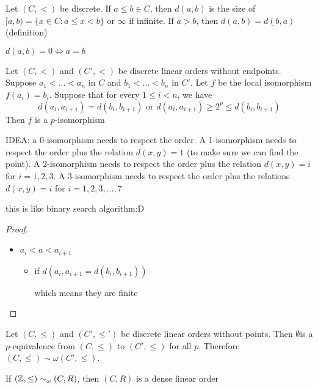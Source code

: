 \documentclass[11pt]{article}
\begin{document}
\begin{definition}[]
Let \((C,<)\) be discrete. If \(a\le b\in C\), then \(d(a,b)\) is the size
of \([a,b)=\{x\in C:a\le x<b\}\) or \(\infty\) if infinite. If \(a>b\), then \(d(a,b)=d(b,a)\) (definition)
\end{definition}

\(d(a,b)=0\Leftrightarrow a=b\)

\begin{lemma}[]
Let \((C,<)\) and \((C',<)\) be discrete linear orders without endpoints. Suppose \(a_1<\dots<a_n\)
in \(C\) and \(b_1<\dots<b_n\) in \(C'\). Let \(f\) be the local isomorphism \(f(a_i)=b_i\). Suppose
that for every \(1\le i<n\), we have
\begin{equation*}
d(a_i,a_{i+1})=d(b_i,b_{i+1})\text{ or }d(a_i,a_{i+1})\ge 2^p\le d(b_i,b_{i+1})
\end{equation*}
Then \(f\) is a \(p\)-isomorphism
\end{lemma}

IDEA: a 0-isomorphism needs to respect the order. A 1-isomorphism needs to respect the order
plus the relation \(d(x,y)=1\) (to make sure we can find the point). A 2-isomorphism needs to
respect the order plus the
relation \(d(x,y)=i\) for \(i=1,2,3\). A 3-isomorphism needs to respect the order plus the
relations \(d(x,y)=i\) for \(i=1,2,3,\dots,7\)

this is like binary search algorithm:D

\begin{proof}
\begin{itemize}
\item \(a_i<a<a_{i+1}\)
\begin{itemize}
\item if \(d(a_i,a_{i+1}=d(b_i,b_{i+1}))\)

which means they are finite
\end{itemize}
\end{itemize}
\end{proof}

\begin{theorem}[]
Let \((C,\le)\) and \((C',\le')\) be discrete linear orders without points. Then \(\emptyset\)is
a \(p\)-equivalence from \((C,\le)\) to \((C',\le)\) for all \(p\). Therefore \((C,\le)\sim\omega(C',\le)\).
\end{theorem}

\begin{remark}
If \((\mathbb{Z},\le)\sim_\omega(C,R)\), then \((C,R)\) is a dense linear order
\end{remark}
\end{document}
